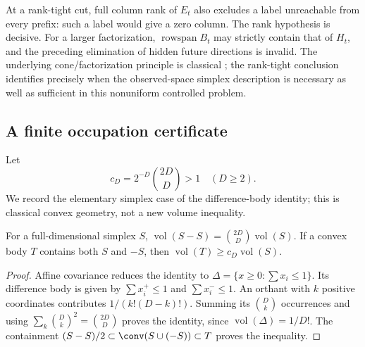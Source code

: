 At a rank-tight cut, full column rank of $E_t$ also excludes a label unreachable from every prefix: such a label would give a zero column. The rank hypothesis is decisive. For a larger factorization,
$\operatorname{rowspan}B_t$ may strictly contain that of $H_t$, and the
preceding elimination of hidden future directions is invalid. The
underlying cone/factorization principle is classical \cite{BF04}; the
rank-tight conclusion identifies precisely when the observed-space
simplex description is necessary as well as sufficient in this
nonuniform controlled problem.

\subsection{A finite occupation certificate}
Let
\[
 c_D=2^{-D}\binom{2D}{D}>1\quad(D\ge2).
\]
We record the elementary simplex case of the difference-body identity;
this is classical convex geometry, not a new volume inequality.

\begin{lemma}\label{lem:difference50}
For a full-dimensional simplex $S$,
$\operatorname{vol}(S-S)=\binom{2D}{D}\operatorname{vol}(S)$.
If a convex body $T$ contains both $S$ and $-S$, then
$\operatorname{vol}(T)\ge c_D\operatorname{vol}(S)$.
\end{lemma}
\begin{proof}
Affine covariance reduces the identity to
$\Delta=\{x\ge0:\sum x_i\le1\}$. Its difference body is given by
$\sum x_i^+\le1$ and $\sum x_i^-\le1$. An orthant with $k$ positive
coordinates contributes $1/(k!(D-k)!)$. Summing its $\binom{D}{k}$
occurrences and using $\sum_k\binom{D}{k}^2=\binom{2D}{D}$ proves the
identity, since $\operatorname{vol}(\Delta)=1/D!$. The containment
$(S-S)/2\subset\conv(S\cup(-S))\subset T$ proves the inequality.
\end{proof}

